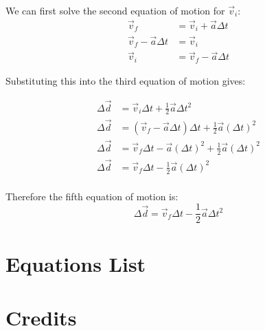 \documentclass{article}
\begin{document}
We can first solve the second equation of motion for $\vec{v}_i$:
\begin{align}
    \vec{v}_f &= \vec{v}_i + \vec{a}\Delta t\\
    \vec{v}_f - \vec{a}\Delta t &= \vec{v}_i \\ 
    \vec{v}_i &= \vec{v}_f - \vec{a}\Delta t
\end{align}

Substituting this into the third equation of motion gives:

\begin{align}
    \Delta \vec{d} &= \vec{v}_i\Delta t + \frac{1}{2}\vec{a}\Delta t^2\\
    \Delta \vec{d} &= (\vec{v}_f - \vec{a}\Delta t)\Delta t + \frac{1}{2}\vec{a}(\Delta t)^2\\
    \Delta \vec{d} &= \vec{v}_f\Delta t - \vec{a}(\Delta t)^2 + \frac{1}{2}\vec{a}(\Delta t)^2\\
    \Delta \vec{d} &= \vec{v}_f\Delta t - \frac{1}{2}\vec{a}(\Delta t)^2\\
\end{align}

Therefore the fifth equation of motion is:
\begin{equation}
    \Delta \vec{d} = \vec{v}_f\Delta t - \frac{1}{2}\vec{a}\Delta t^2
\end{equation}







\pagebreak
\appendix
\section*{Equations List}
%


\pagebreak
\printindex

\pagebreak
\section*{Credits}
%
\end{document}
